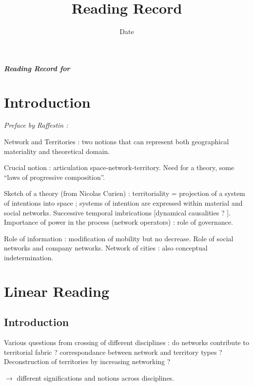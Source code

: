 


\title{Reading Record\bigskip\\
\cite{offner1996reseaux}
}
\author{}
\date{Date}


\maketitle

\textbf{\textit{Reading Record for \cite{offner1996reseaux}}}


\section{Introduction}

\textit{Preface by Raffestin : }

Network and Territories : two notions that can represent both geographical materiality and theoretical domain.

Crucial notion : articulation space-network-territory. Need for a theory, some ``laws of progressive composition''.

Sketch of a theory (from Nicolas Curien) : territoriality = projection of a system of intentions into space ; systems of intention are expressed within material and social networks. Successive temporal imbrications [dynamical causalities ? ]. Importance of power in the process (network operators) : role of governance. 

Role of information : modification of mobility but no decrease. Role of social networks and company networks. Network of cities : also conceptual indetermination.


\section{Linear Reading}

\subsection{Introduction}

Various questions from crossing of different disciplines : do networks contribute to territorial fabric ? correspondance between network and territory types ? Deconstruction of territories by increasing networking ?

$\rightarrow$ different significations and notions across disciplines.

